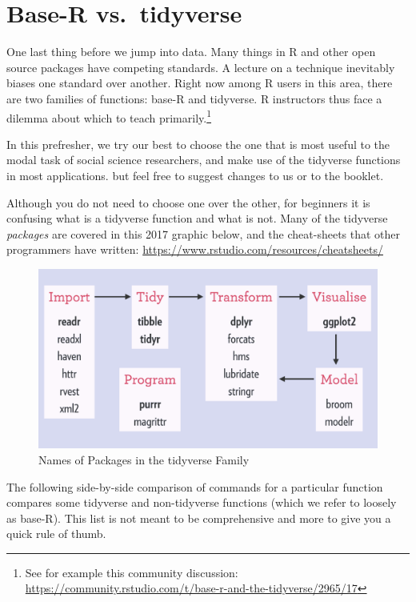 \documentclass[
]{book}
\theoremstyle{definition}
\theoremstyle{definition}
\theoremstyle{definition}
\theoremstyle{remark}
\begin{document}
\hypertarget{base-r-vs.-tidyverse}{%
\section{Base-R vs.~tidyverse}\label{base-r-vs.-tidyverse}}

One last thing before we jump into data. Many things in R and other open source packages have competing standards. A lecture on a technique inevitably biases one standard over another. Right now among R users in this area, there are two families of functions: base-R and tidyverse. R instructors thus face a dilemma about which to teach primarily.\footnote{See for example this community discussion: \url{https://community.rstudio.com/t/base-r-and-the-tidyverse/2965/17}}

In this prefresher, we try our best to choose the one that is most useful to the modal task of social science researchers, and make use of the tidyverse functions in most applications. but feel free to suggest changes to us or to the booklet.

Although you do not need to choose one over the other, for beginners it is confusing what is a tidyverse function and what is not. Many of the tidyverse \emph{packages} are covered in this 2017 graphic below, and the cheat-sheets that other programmers have written: \url{https://www.rstudio.com/resources/cheatsheets/}

\begin{figure}
\centering
\includegraphics{images/tidyverse-packages.png}
\caption{Names of Packages in the tidyverse Family}
\end{figure}

The following side-by-side comparison of commands for a particular function compares some tidyverse and non-tidyverse functions (which we refer to loosely as base-R). This list is not meant to be comprehensive and more to give you a quick rule of thumb.
\end{document}
